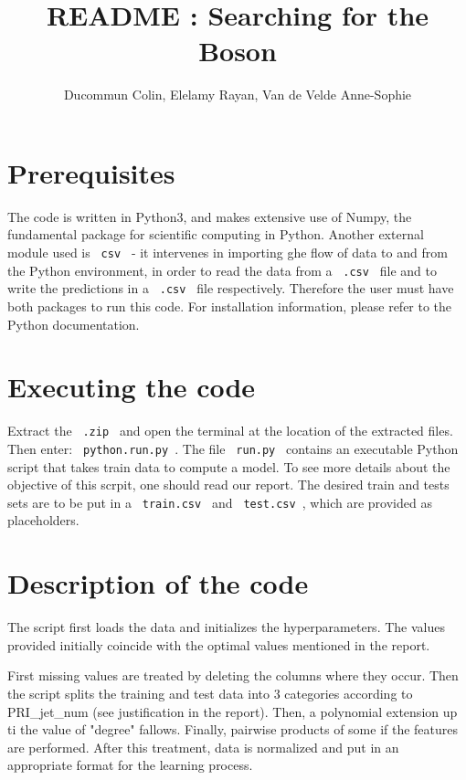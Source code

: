 \documentclass[11pt, oneside]{article}   	%
\title{README : Searching for the Boson}
\author{Ducommun Colin, Elelamy Rayan, Van de Velde Anne-Sophie}
\date{}
\begin{document}
\maketitle

\section{Prerequisites}

The code is written in Python3, and makes extensive use of Numpy, the fundamental package for scientific computing in Python. Another external module used is \lstinline" csv " - it intervenes in importing ghe flow of data to and from the Python environment, in order to read the data from a \lstinline" .csv " file and to write the predictions in a \lstinline" .csv " file respectively. Therefore the user must have both packages to run this code. For installation information, please refer to the Python documentation. 

\section{Executing the code}

Extract the \lstinline" .zip " and open the terminal at the location of the extracted files. Then enter: \lstinline" python.run.py ". The file \lstinline" run.py " contains an executable Python script that takes train data to compute a model. To see more details about the objective of this scrpit, one should read our report. The desired train and tests sets are to be put in a \lstinline" train.csv " and \lstinline" test.csv ", which are provided as placeholders. 

\section{Description of the code}

The script first loads the data and initializes the hyperparameters. The values provided initially coincide with the optimal values mentioned in the report. 

First missing values are treated by deleting the columns where they occur. Then the script splits the training and test data into $3$ categories according to PRI\_jet\_num (see justification in the report). Then, a polynomial extension up ti the value of "degree" fallows. Finally, pairwise products of some if the features are performed. After this treatment, data is normalized and put in an appropriate format for the learning process.
\end{document}
